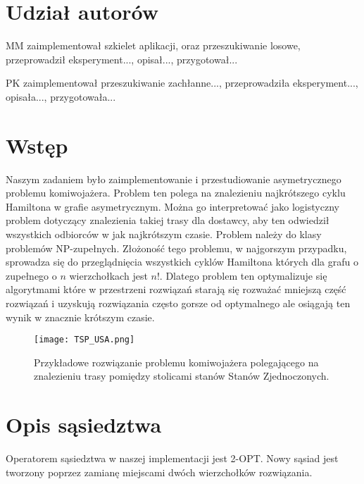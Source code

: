 \documentclass{article}
\begin{document}


\section*{Udział autorów}
\begin{tightlist}
\item MM zaimplementował szkielet aplikacji, oraz przeszukiwanie losowe, przeprowadził eksperyment..., opisał..., przygotował...
\item PK zaimplementował przeszukiwanie zachłanne..., przeprowadziła eksperyment..., opisała..., przygotowała...
\end{tightlist}






\section{Wstęp}

Naszym zadaniem było zaimplementowanie i przestudiowanie asymetrycznego problemu komiwojażera. Problem ten polega na znalezieniu najkrótszego cyklu Hamiltona w grafie asymetrycznym. Można go interpretować jako logistyczny problem dotyczący znalezienia takiej trasy dla dostawcy, aby ten odwiedził wszystkich odbiorców w jak najkrótszym czasie. Problem należy do klasy problemów NP-zupełnych. Złożoność tego problemu, w najgorszym przypadku, sprowadza się do przeglądnięcia wszystkich cyklów Hamiltona których dla grafu o zupełnego o $n$ wierzchołkach jest $n!$. Dlatego problem ten optymalizuje się algorytmami które w przestrzeni rozwiązań starają się rozważać mniejszą część rozwiązań i uzyskują rozwiązania często gorsze od optymalnego ale osiągają ten wynik w znacznie krótszym czasie.

\begin{figure} 
\begin{center}
\texttt{[image: TSP\_USA.png]}
\end{center}
\caption{Przykładowe rozwiązanie problemu komiwojażera polegającego na znalezieniu trasy pomiędzy stolicami stanów Stanów Zjednoczonych.}
\label{fig:schemat}
\end{figure}


\section{Opis sąsiedztwa}

Operatorem sąsiedztwa w naszej implementacji jest 2-OPT. Nowy sąsiad jest tworzony poprzez zamianę miejscami dwóch wierzchołków rozwiązania. 
\end{document}
